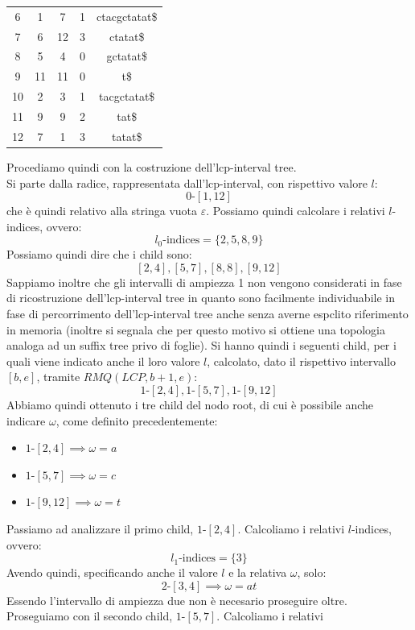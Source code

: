 \documentclass[a4paper,12pt, oneside]{book}
\begin{document}
\begin{esempio}
\begin{table}[H]
\begin{tabular}{c|c|c|c|c|}
      6 & 1 & 7 & 1 & ctacgctatat\$  \\ 
      7 & 6 & 12 & 3 & ctatat\$ \\
      8 & 5 & 4 & 0 & gctatat\$  \\ 
      9 & 11 & 11 & 0 & t\$  \\ 
      10 & 2 & 3 & 1 & tacgctatat\$  \\ 
      11 & 9 & 9 & 2 & tat\$  \\ 
      12 & 7 & 1 & 3 & tatat\$  
    \end{tabular}
  \end{table}
  \noindent
  Procediamo quindi con la costruzione dell'lcp-interval tree.\\
  Si parte dalla radice, rappresentata dall'lcp-interval, con rispettivo valore
  $l$:
  \[0\mbox{-}[1,12]\]
  che è quindi relativo alla stringa vuota $\varepsilon$. Possiamo quindi
  calcolare i relativi $l$-indices, ovvero:
  \[l_0\mbox{-indices}=\{2,5,8,9\}\]
  Possiamo quindi dire che i child sono:
  \[[2,4],[5,7],[8,8],[9,12]\]
  Sappiamo inoltre che gli intervalli di ampiezza 1 non vengono considerati in
  fase di ricostruzione dell'lcp-interval tree in quanto sono facilmente
  individuabile in fase di percorrimento dell'lcp-interval tree anche senza
  averne espclito riferimento in memoria (inoltre si segnala che per questo
  motivo si ottiene una topologia analoga ad un suffix tree privo di foglie). Si
  hanno quindi i seguenti child, per i quali viene indicato anche il loro valore
  $l$, calcolato, dato il rispettivo intervallo $[b,e]$, tramite
  $RMQ(LCP,b+1,e)$: 
  \[1\mbox{-}[2,4],1\mbox{-}[5,7],1\mbox{-}[9,12]\]
  \newpage
  Abbiamo quindi ottenuto i tre child del nodo root, di cui è possibile anche
  indicare $\omega$, come definito precedentemente:
  \begin{itemize}
    \item $1\mbox{-}[2,4]\implies \omega=a$
    \item $1\mbox{-}[5,7]\implies \omega=c$
    \item $1\mbox{-}[9,12]\implies \omega=t$
  \end{itemize}
  Passiamo ad analizzare il primo child, $1\mbox{-}[2,4]$. Calcoliamo i relativi
  $l$-indices, ovvero: 
  \[l_1\mbox{-indices}=\{3\}\]
  Avendo quindi, specificando
  anche il valore $l$ e la relativa $\omega$, solo:
  \[2\mbox{-}[3,4]\implies \omega=at\]
  Essendo l'intervallo di ampiezza due non è necesario proseguire oltre.\\
  Proseguiamo con il secondo child, $1\mbox{-}[5,7]$. Calcoliamo i relativi

\end{esempio}
\end{document}
